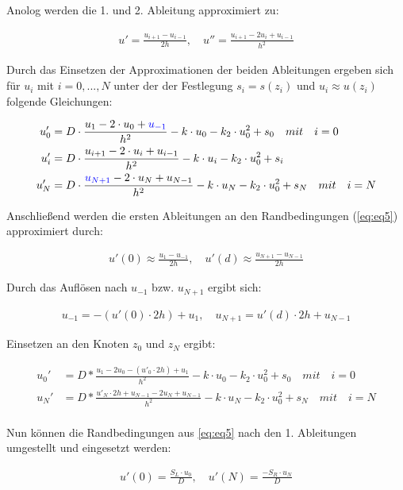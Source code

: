 \documentclass[
	pagesize,
	fontsize=12pt,
	paper=a4,
	oneside,
   reqno
]{scrartcl}
\begin{document}
Anolog werden die 1. und 2. Ableitung approximiert zu:

\begin{align*}
   u' = \frac{u_{i+1}-u_{i-1}}{2h}, \quad u'' = \frac{u_{i+1}-2u_{i}+u_{i-1}}{h^2}
\end{align*}

Durch das Einsetzen der Approximationen der beiden Ableitungen ergeben sich für $u_i$ mit $i=0, ... ,N$ unter der der Festlegung $s_i = s(z_i)$ und $u_i \approx u(z_i)$ folgende Gleichungen:

\begin{align*}
   u_0' &= D\cdot \frac{u_1-2\cdot u_0+\textcolor{blue}{u_{-1}}}{h^2} - k\cdot u_0 -k_2\cdot u_0^2 + s_0 \quad mit \quad i = 0 \\
   u_i' &= D\cdot \frac{u_{i+1}-2\cdot u_i+u_{i-1}}{h^2} - k\cdot u_i -k_2\cdot u_0^2 + s_i \\
   u_N' &= D\cdot \frac{\textcolor{blue}{u_{N+1}}-2\cdot u_N+u_{N-1}}{h^2} - k\cdot u_N -k_2\cdot u_0^2 + s_N \quad mit \quad i = N \\
\end{align*}

Anschließend werden die ersten Ableitungen an den Randbedingungen (\autoref{eq:eq5}) approximiert durch:

\begin{align*}
   u'(0) \approx \frac{u_1-u_{-1}}{2h}, \quad u'(d) \approx \frac{u_{N+1}-u_{N-1}}{2h}
\end{align*}

Durch das Auflösen nach $u_{-1}$ bzw. $u_{N+1}$ ergibt sich:

\begin{align*}
   u_{-1} = -(u'(0)\cdot 2h) + u_1, \quad u_{N+1} = u'(d)\cdot 2h + u_{N-1}
\end{align*}

Einsetzen an den Knoten $z_0$ und $z_N$ ergibt:

\begin{align*}
   u_0' &= D*\frac{u_1-2u_0-(u'_0\cdot 2h)+u_1}{h^2} - k\cdot u_0 -k_2\cdot u_0^2 + s_0 \quad mit \quad i = 0 \\
   u_N' &= D*\frac{u'_N\cdot 2h+u_{N-1}-2u_N+u_{N-1}}{h^2} - k\cdot u_N -k_2\cdot u_0^2 + s_N \quad mit \quad i = N \\
\end{align*}

Nun können die Randbedingungen aus \autoref{eq:eq5} nach den 1. Ableitungen umgestellt und eingesetzt werden:

\begin{align*}
   u'(0) = \frac{S_L \cdot u_0}{D}, \quad u'(N) = \frac{-S_R \cdot u_N}{D}
\end{align*}
\end{document}
